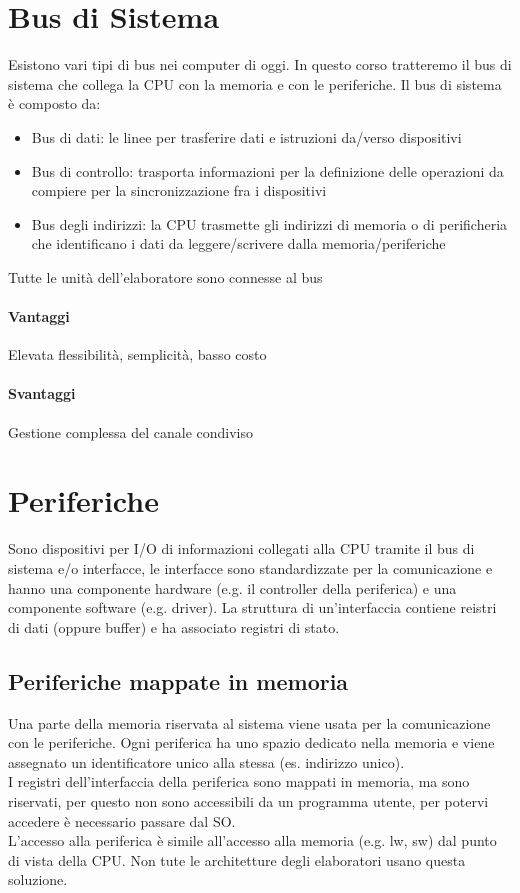 \documentclass[12pt, a4paper, openany]{book}
\begin{document}
\section{Bus di Sistema}
Esistono vari tipi di bus nei computer di oggi. In questo corso tratteremo il bus di sistema
che collega la CPU con la memoria e con le periferiche.
Il bus di sistema è composto da:
\begin{itemize}
    \item Bus di dati: le linee per trasferire dati e istruzioni da/verso dispositivi
    \item Bus di controllo: trasporta informazioni per la definizione delle operazioni
    da compiere per la sincronizzazione fra i dispositivi
    \item Bus degli indirizzi: la CPU trasmette gli indirizzi di memoria o di perificheria che
    identificano i dati da leggere/scrivere dalla memoria/periferiche
\end{itemize}
Tutte le unità dell'elaboratore sono connesse al bus
\paragraph*{Vantaggi} Elevata flessibilità, semplicità, basso costo
\paragraph*{Svantaggi} Gestione complessa del canale condiviso

\section{Periferiche}
Sono dispositivi per I/O di informazioni collegati alla CPU tramite il bus di sistema e/o interfacce,
le interfacce sono standardizzate per la comunicazione e hanno una componente hardware (e.g. il controller
della periferica) e una componente software (e.g. driver).
La struttura di un'interfaccia contiene reistri di dati (oppure buffer) e ha associato registri di stato.

\subsection*{Periferiche mappate in memoria}
Una parte della memoria riservata al sistema viene usata per la comunicazione con le periferiche.
Ogni periferica ha uno spazio dedicato nella memoria e viene assegnato un identificatore unico alla stessa
(es. indirizzo unico).
\\ I registri dell'interfaccia della periferica sono mappati in memoria, ma sono riservati, per questo non sono accessibili da
un programma utente, per potervi accedere è necessario passare dal SO.
\\ L'accesso alla periferica è simile all'accesso alla memoria (e.g. lw, sw) dal punto di vista della CPU.
Non tute le architetture degli elaboratori usano questa soluzione.
\end{document}
